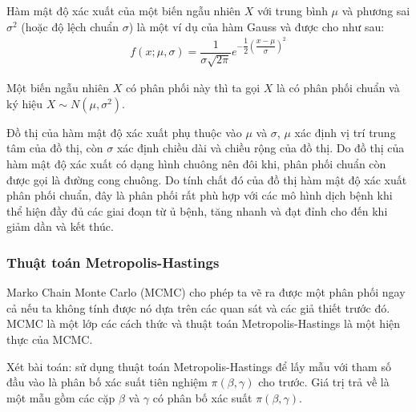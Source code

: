 \documentclass[a4paper]{article}
\begin{document}
Hàm mật độ xác xuất của một biến ngẫu nhiên $X$ với trung bình $\mu$ và phương sai $\sigma^2$ (hoặc độ lệch chuẩn $\sigma$) là một ví dụ của hàm Gauss và được cho như sau:
\begin{align}
    f(x; \mu, \sigma) = \dfrac{1}{\sigma \sqrt{2\pi}}  e^{-\dfrac{1}{2}\left(\dfrac{x-\mu}{\sigma}\right)^2}
\end{align}

Một biến ngẫu nhiên $X$ có phân phối này thì ta gọi $X$ là có phân phối chuẩn và ký hiệu $X\sim N(\mu,\sigma^2)$.

Đồ thị của hàm mật độ xác xuất phụ thuộc vào $\mu$ và $\sigma$, $\mu$ xác định vị trí trung tâm của đồ thị, còn $\sigma$ xác định chiều dài và chiều rộng của đồ thị. Do đồ thị của hàm mật độ xác xuất có dạng hình chuông nên đôi khi, phân phối chuẩn còn được gọi là đường cong chuông. Do tính chất đó của đồ thị hàm mật độ xác xuất phân phối chuẩn, đây là phân phối rất phù hợp với các mô hình dịch bệnh khi thể hiện đầy đủ các giai đoạn từ ủ bệnh, tăng nhanh và đạt đỉnh cho đến khi giảm dần và kết thúc. 
\subsubsection{Thuật toán Metropolis-Hastings}
Marko Chain Monte Carlo (MCMC) cho phép ta vẽ ra được một phân phối ngay cả nếu ta không tính được nó dựa trên các quan sát và các giả thiết trước đó. MCMC là một lớp các cách thức và thuật toán Metropolis-Hastings là một hiện thực của MCMC.

Xét bài toán: sử dụng thuật toán Metropolis-Hastings để lấy mẫu với tham số đầu vào là phân bố xác suất tiên nghiệm $\pi(\beta, \gamma)$ cho trước. Giá trị trả về là một mẫu gồm các cặp $\beta$ và $\gamma$ có phân bố xác suất $\pi(\beta, \gamma)$.
\end{document}

